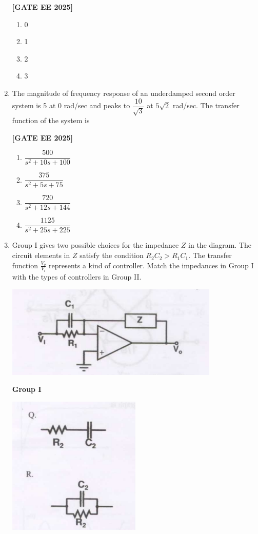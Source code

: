 \documentclass[12pt]{article}
\begin{document}
\begin{enumerate}[leftmargin=*, label=\textbf{Q.\arabic*:}]
\noindent \textbf{[GATE EE 2025]}
\begin{enumerate}[label=(\Alph*)]
  \item 0
  \item 1
  \item 2
  \item 3
\end{enumerate}

\item The magnitude of frequency response of an underdamped second order system is 5 at 0 rad/sec and peaks to $\dfrac{10}{\sqrt{3}}$ at $5 \sqrt{2}$ rad/sec. The transfer function of the system is
 
\noindent \textbf{[GATE EE 2025]}
\begin{enumerate}[label=(\Alph*)]
  \item $\dfrac{500}{s^2 + 10s + 100}$
  \item $\dfrac{375}{s^2 + 5s + 75}$
  \item $\dfrac{720}{s^2 + 12s + 144}$
  \item $\dfrac{1125}{s^2 + 25s + 225}$
\end{enumerate}

\item
Group I gives two possible choices for the impedance $Z$ in the diagram. The circuit elements in $Z$ satisfy the condition $R_2C_2 > R_1C_1$. The transfer function $\frac{V_o}{V_i}$ represents a kind of controller. Match the impedances in Group I with the types of controllers in Group II.
\begin{center}
\includegraphics[width=0.8\textwidth]{figs/q43a.png}
\end{center}
\textbf{Group I}

\includegraphics[width=0.5\textwidth]{figs/q43b.png}


\end{enumerate}
\end{document}
